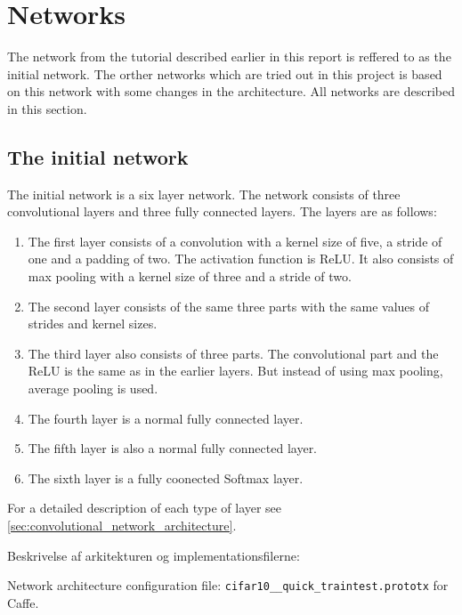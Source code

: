 \graphicspath{{Chapters/Project/}}

\section{Networks} %
\label{sec:networks}

The network from the tutorial described earlier in this report is reffered to
as the initial network. The orther networks which are tried out in this
project is based on this network with some changes in the architecture. All
networks are described in this section.

\subsection{The initial network} %
\label{sub:the_initial_network}

The initial network is a six layer network. The network consists of three
convolutional layers and three fully connected layers. The layers are as
follows:

\begin{enumerate}
	\item The first layer consists of a convolution with a kernel size of five, a
	stride of one and a padding of two. The activation function is ReLU. It
	also consists of max pooling with a kernel size of three and a stride of two.
	\item The second layer consists of the same three parts with the same values
	of strides and kernel sizes.
	\item The third layer also consists of three parts. The convolutional part
	and the ReLU is the same as in the earlier layers. But instead of using max
	pooling, average pooling is used.
	\item The fourth layer is a normal fully connected layer.
	\item The fifth layer is also a normal fully connected layer.
	\item The sixth layer is a fully coonected Softmax layer.
\end{enumerate}
For a detailed description of each type of layer see
\autoref{sec:convolutional_network_architecture}.


Beskrivelse af arkitekturen og implementationsfilerne:

Network architecture configuration file: \verb|cifar10__quick_traintest.prototx|
for Caffe.


